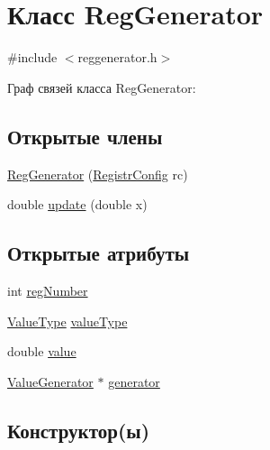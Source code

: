 \hypertarget{class_reg_generator}{}\section{Класс Reg\+Generator}
\label{class_reg_generator}


{\ttfamily \#include $<$reggenerator.\+h$>$}



Граф связей класса Reg\+Generator\+:
\subsection*{Открытые члены}
\begin{DoxyCompactItemize}
\item 
\hyperlink{class_reg_generator_af64142fffe52d51c318429c8c41c94b0}{Reg\+Generator} (\hyperlink{class_registr_config}{Registr\+Config} rc)
\item 
double \hyperlink{class_reg_generator_ad05c095a9abdf17204d6544e324ee0fb}{update} (double x)
\end{DoxyCompactItemize}
\subsection*{Открытые атрибуты}
\begin{DoxyCompactItemize}
\item 
int \hyperlink{class_reg_generator_ab0d02ad51a8bf660fdf2c2089c5f4933}{reg\+Number}
\item 
\hyperlink{_random_types_8h_ad9971b6ef33e02ba2c75d19c1d2518a1}{Value\+Type} \hyperlink{class_reg_generator_aabe826a51b5b4917754f94264f601ea8}{value\+Type}
\item 
double \hyperlink{class_reg_generator_ad557c58539b7d84e7667d0259d739000}{value}
\item 
\hyperlink{class_value_generator}{Value\+Generator} $\ast$ \hyperlink{class_reg_generator_a091fffa8ce1f44ca378d8adafac69053}{generator}
\end{DoxyCompactItemize}


\subsection{Конструктор(ы)}
\mbox{\label{class_reg_generator_af64142fffe52d51c318429c8c41c94b0}} 
